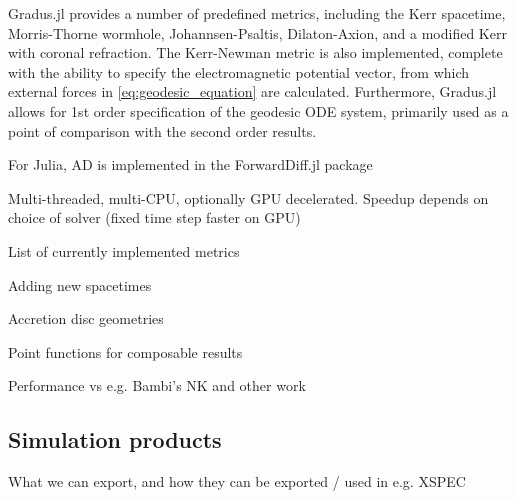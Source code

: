 Gradus.jl provides a number of predefined metrics, including the Kerr spacetime, Morris-Thorne wormhole, Johannsen-Psaltis, Dilaton-Axion, and a modified Kerr with coronal refraction. The Kerr-Newman metric is also implemented, complete with the ability to specify the electromagnetic potential vector, from which external forces in \eqref{eq:geodesic_equation} are calculated. Furthermore, Gradus.jl allows for 1st order specification of the geodesic ODE system, primarily used as a point of comparison with the second order results.

For Julia, AD is implemented in the ForwardDiff.jl package \citep{RevelsLubinPapamarkou2016}

Multi-threaded, multi-CPU, optionally GPU decelerated. Speedup depends on choice of solver (fixed time step faster on GPU)

List of currently implemented metrics

Adding new spacetimes

Accretion disc geometries

Point functions for composable results

Performance vs e.g. Bambi's NK and other work

\subsection{Simulation products}

What we can export, and how they can be exported / used in e.g. XSPEC


